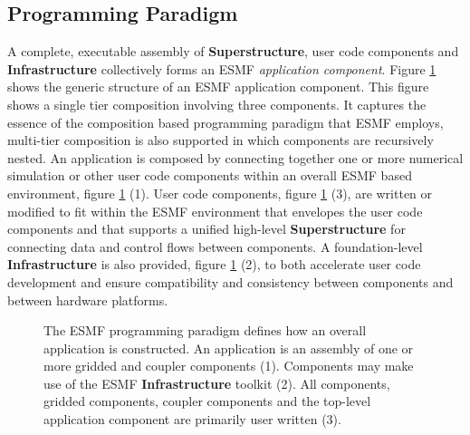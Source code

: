 \subsection{Programming Paradigm}
A complete, executable assembly of {\bf Superstructure}, user code components and {\bf Infrastructure} collectively forms an ESMF {\it application component}.
Figure \ref{fig:ESMFApplication} shows the generic structure of an ESMF application component. 
This figure shows a single tier composition involving three components. It captures the essence of the composition based programming paradigm that 
ESMF employs, multi-tier composition is also supported in which components are recursively nested.
An application is composed by connecting together one or more
numerical simulation or other user code components within an overall ESMF based environment, figure \ref{fig:ESMFApplication} (1). User code components, figure \ref{fig:ESMFApplication} (3), are written
or modified to fit within the ESMF environment that envelopes
the user code components and that supports a unified high-level {\bf Superstructure} for connecting data and control flows between 
components. A foundation-level {\bf Infrastructure} is also provided, figure \ref{fig:ESMFApplication} (2),
to both accelerate user code development and ensure compatibility
and consistency between components and between hardware platforms. 
\begin{center}
\begin{figure}
\caption{The ESMF programming paradigm defines how an overall application is constructed. An application is an assembly
of one or more gridded and coupler components (1). Components may make use of the ESMF {\bf Infrastructure} toolkit (2). All components,
gridded components, coupler components and the top-level application component are primarily user written (3).}
\label{fig:ESMFApplication}
\end{figure}
\end{center}

